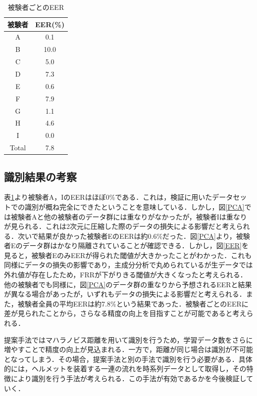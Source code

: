 \documentclass[Japanese,noauthor]{dicomopapers}
\begin{document}
\begin{table}[htb]
  \centering
  \caption{被験者ごとのEER}
  \begin{tabular}{|c|c|} \hline
    被験者 & EER(\%) \\ \hline \hline
    A & 0.1 \\
    B & 10.0 \\
    C & 5.0 \\
    D & 7.3 \\
    E & 0.6 \\
    F & 7.9 \\
    G & 1.1 \\
    H & 4.6 \\
    I & 0.0 \\ \hline
    Total & 7.8 \\ \hline
  \end{tabular}
  \label{EER_num}
\end{table}

\subsection{識別結果の考察}
表\ref{EER_num}より被験者A，IのEERはほぼ0\%である．これは，検証に用いたデータセットでの識別が概ね完全にできたということを意味している．しかし，図\ref{PCA}では被験者Aと他の被験者のデータ群には重なりがなかったが，被験者Iは重なりが見られる．これは2次元に圧縮した際のデータの損失による影響だと考えられる．次いで結果が良かった被験者EのEERは約0.6\%だった．図\ref{PCA}より，被験者Eのデータ群はかなり隔離されていることが確認できる．しかし，図\ref{EER}を見ると，被験者EのみEERが得られた閾値が大きかったことがわかった．これも同様にデータの損失の影響であり，主成分分析で丸められているが生データでは外れ値が存在したため，FRRが下がりきる閾値が大きくなったと考えられる．他の被験者でも同様に，図\ref{PCA}のデータ群の重なりから予想されるEERと結果が異なる場合があったが，いずれもデータの損失による影響だと考えられる．また，被験者全員の平均EERは約7.8\%という結果であった．被験者ごとのEERに差が見られたことから，さらなる精度の向上を目指すことが可能であると考えられる．\par
提案手法ではマハラノビス距離を用いて識別を行うため，学習データ数をさらに増やすことで精度の向上が見込まれる．一方で，距離が同じ場合は識別が不可能となってしまう．その場合，提案手法と別の手法で識別を行う必要がある．具体的には，ヘルメットを装着する一連の流れを時系列データとして取得し，その特徴により識別を行う手法が考えられる．この手法が有効であるかを今後検証していく．
\end{document}
